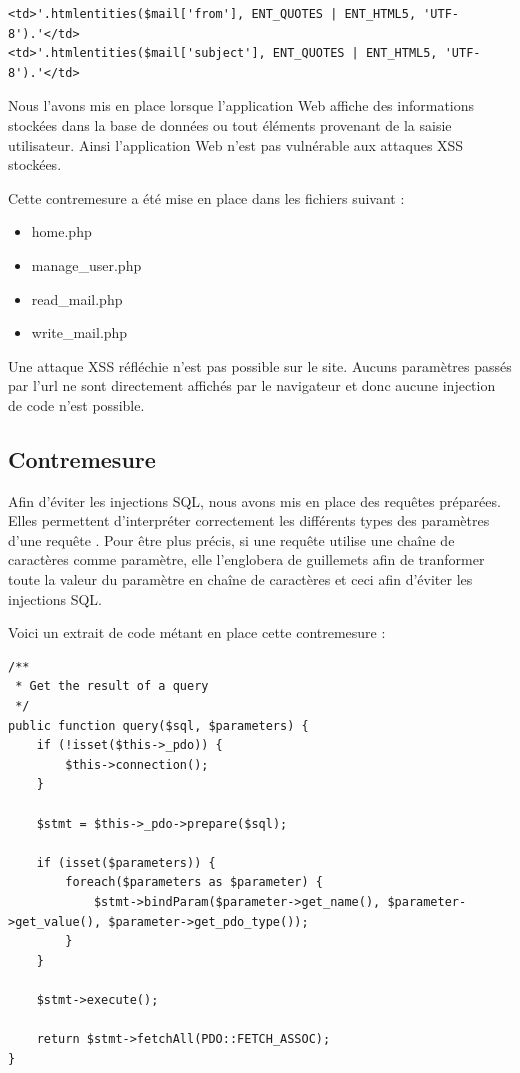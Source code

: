 \documentclass[12pt]{article}
\begin{document}
\begin{lstlisting}[style=JAVA]
<td>'.htmlentities($mail['from'], ENT_QUOTES | ENT_HTML5, 'UTF-8').'</td>
<td>'.htmlentities($mail['subject'], ENT_QUOTES | ENT_HTML5, 'UTF-8').'</td>
\end{lstlisting}

Nous l'avons mis en place lorsque l'application Web affiche des informations stockées dans la base de données ou tout éléments provenant de la saisie utilisateur. Ainsi l'application Web n'est pas vulnérable aux attaques XSS stockées.

Cette contremesure a été mise en place dans les fichiers suivant :

\begin{itemize}
\item home.php
\item manage\_user.php
\item read\_mail.php
\item write\_mail.php
\end{itemize}

Une attaque XSS réfléchie n'est pas possible sur le site. Aucuns paramètres passés par l'url ne sont directement affichés par le navigateur et donc aucune injection de code n'est possible.

\newpage
\subsection{Contremesure}\label{c3}

Afin d'éviter les injections SQL, nous avons mis en place des requêtes préparées. Elles permettent d'interpréter correctement les différents types des paramètres d'une requête . Pour être plus précis, si une requête utilise une chaîne de caractères comme paramètre, elle l'englobera de guillemets afin de tranformer toute la valeur du paramètre en chaîne de caractères et ceci afin d'éviter les injections SQL.

Voici un extrait de code métant en place cette contremesure : 

\begin{lstlisting}[style=JAVA]
/**
 * Get the result of a query
 */
public function query($sql, $parameters) {
    if (!isset($this->_pdo)) {
        $this->connection();
    }

    $stmt = $this->_pdo->prepare($sql);
    
    if (isset($parameters)) {
        foreach($parameters as $parameter) {
            $stmt->bindParam($parameter->get_name(), $parameter->get_value(), $parameter->get_pdo_type());
        }
    }

    $stmt->execute();

    return $stmt->fetchAll(PDO::FETCH_ASSOC);
}
\end{lstlisting}
\end{document}
